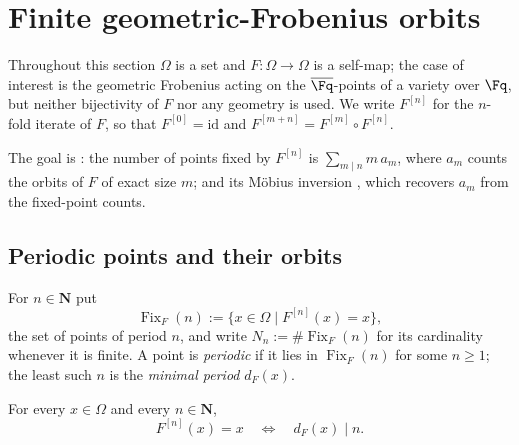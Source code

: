 
\section{Finite geometric-Frobenius orbits}
\label{sec:weil-finite-orbits}

Throughout this section $\Omega$ is a set and $F\colon\Omega\to\Omega$ is a
self-map; the case of interest is the geometric Frobenius acting on the
$\overline{\Fq}$-points of a variety over $\Fq$, but neither bijectivity of
$F$ nor any geometry is used.  We write $F^{[n]}$ for the $n$-fold iterate of
$F$, so that $F^{[0]}=\mathrm{id}$ and $F^{[m+n]}=F^{[m]}\circ F^{[n]}$.

The goal is : the number of points
fixed by $F^{[n]}$ is $\sum_{m\mid n}m\,a_m$, where $a_m$ counts the orbits of
$F$ of exact size $m$; and its Möbius inversion
, which recovers $a_m$ from
the fixed-point counts.

\subsection{Periodic points and their orbits}

\begin{definition}
  \label{def:weil-frobenius-fixed-point-set}
  \leanok

  For $n\in\mathbf N$ put
  \[
    \operatorname{Fix}_F(n):=\{x\in\Omega \mid F^{[n]}(x)=x\},
  \]
  the set of points of period $n$, and write
  $N_n:=\#\operatorname{Fix}_F(n)$ for its cardinality whenever it is finite.
  A point is \emph{periodic} if it lies in $\operatorname{Fix}_F(n)$ for some
  $n\ge 1$; the least such $n$ is the \emph{minimal period} $d_F(x)$.
\end{definition}

\begin{lemma}
  \label{lemma:weil-frobenius-fixed-iff-orbit-length-divides}
  \leanok

  For every $x\in\Omega$ and every $n\in\mathbf N$,
  \[
    F^{[n]}(x)=x
    \quad\Longleftrightarrow\quad
    d_F(x)\mid n .
  \]
\end{lemma}

